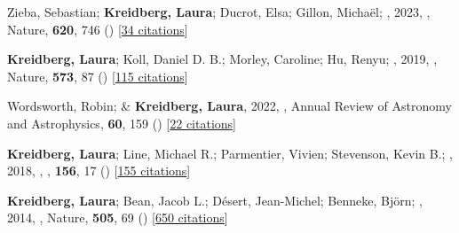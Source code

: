 \documentclass[12pt,letterpaper]{article}
\begin{document}



\begin{list}{}{\cvlist}
\item[{\color{numcolor}\scriptsize23}] Zieba, Sebastian; \textbf{Kreidberg, Laura}; Ducrot, Elsa; Gillon, Micha{\"e}l; \etal, 2023, , Nature, \textbf{620}, 746 () [\href{https://ui.adsabs.harvard.edu/abs/2023Natur.620..746Z}{34 citations}]

\item[{\color{numcolor}\scriptsize2}] \textbf{Kreidberg, Laura}; Koll, Daniel D. B.; Morley, Caroline; Hu, Renyu; \etal, 2019, , Nature, \textbf{573}, 87 () [\href{https://ui.adsabs.harvard.edu/abs/2019Natur.573...87K}{115 citations}]

\item[{\color{numcolor}\scriptsize3}] Wordsworth, Robin; \& \textbf{Kreidberg, Laura}, 2022, , Annual Review of Astronomy and Astrophysics, \textbf{60}, 159 () [\href{https://ui.adsabs.harvard.edu/abs/2022ARA&A..60..159W}{22 citations}]

\item[{\color{numcolor}\scriptsize4}] \textbf{Kreidberg, Laura}; Line, Michael R.; Parmentier, Vivien; Stevenson, Kevin B.; \etal, 2018, , \aj, \textbf{156}, 17 () [\href{https://ui.adsabs.harvard.edu/abs/2018AJ....156...17K}{155 citations}]


\item[{\color{numcolor}\scriptsize5}] \textbf{Kreidberg, Laura}; Bean, Jacob L.; D{\'e}sert, Jean-Michel; Benneke, Bj{\"o}rn; \etal, 2014, , Nature, \textbf{505}, 69 () [\href{https://ui.adsabs.harvard.edu/abs/2014Natur.505...69K}{650 citations}]

\end{list}
\end{document}
